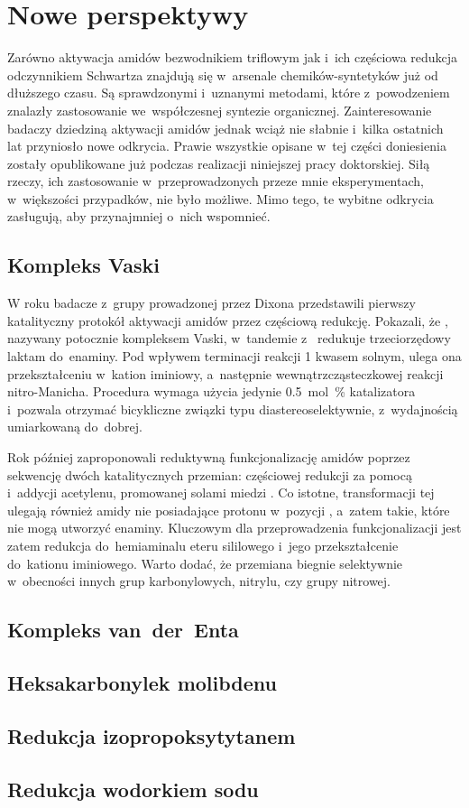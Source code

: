 \section{Nowe perspektywy}\label{literature:new}
Zarówno aktywacja amidów bezwodnikiem triflowym jak i~ich częściowa redukcja odczynnikiem
  Schwartza znajdują się w~arsenale chemików-syntetyków już od dłuższego czasu.
Są sprawdzonymi i~uznanymi metodami, które z~powodzeniem znalazły zastosowanie
  we~współczesnej syntezie organicznej.
Zainteresowanie badaczy dziedziną aktywacji amidów jednak wciąż nie słabnie i~kilka
  ostatnich lat przyniosło nowe odkrycia.
Prawie wszystkie opisane w~tej części doniesienia zostały opublikowane już podczas
  realizacji niniejszej pracy doktorskiej.
Siłą rzeczy, ich zastosowanie w~przeprowadzonych przeze mnie eksperymentach, w~większości
  przypadków, nie było możliwe.
Mimo tego, te wybitne odkrycia zasługują, aby przynajmniej o~nich wspomnieć.

\subsection{Kompleks Vaski}\label{literature:new:vasca}
W roku \citeyear{gregory15} badacze z~grupy prowadzonej przez Dixona przedstawili pierwszy
  katalityczny protokół aktywacji amidów przez częściową redukcję.
Pokazali, że \vaska{}, nazywany potocznie kompleksem Vaski, w~tandemie z~
  redukuje trzeciorzędowy laktam  do~enaminy.
Pod wpływem terminacji reakcji \SI{1}{\Molar} kwasem solnym, ulega ona przekształceniu
  w~kation iminiowy, a~następnie wewnątrzcząsteczkowej reakcji nitro-Manicha.
Procedura wymaga użycia jedynie \SI{0.5}{\mole\percent} katalizatora i~pozwala otrzymać
  bicykliczne związki typu  diastereoselektywnie, z~wydajnością
  umiarkowaną do~dobrej.

Rok później \citeauthor{huang16c} zaproponowali reduktywną funkcjonalizację amidów poprzez
  sekwencję dwóch katalitycznych przemian: częściowej redukcji za pomocą \vaska{} i~addycji
  acetylenu, promowanej solami miedzi .
Co istotne, transformacji tej ulegają również amidy nie posiadające protonu w~pozycji \textalpha{},
  a~zatem takie, które nie mogą utworzyć enaminy.
Kluczowym dla przeprowadzenia funkcjonalizacji jest zatem redukcja do~hemiaminalu eteru sililowego
  i~jego przekształcenie do~kationu iminiowego.
Warto dodać, że przemiana biegnie selektywnie w~obecności innych grup karbonylowych, nitrylu,
  czy grupy nitrowej.

\subsection{Kompleks van~der~Enta}\label{literature:new:van-der-ent}
\subsection{Heksakarbonylek molibdenu}\label{literature:new:molydenium}
\subsection{Redukcja izopropoksytytanem}\label{literature:new:titanium}
\subsection{Redukcja wodorkiem sodu}\label{literature:new:sodium-hydride}
